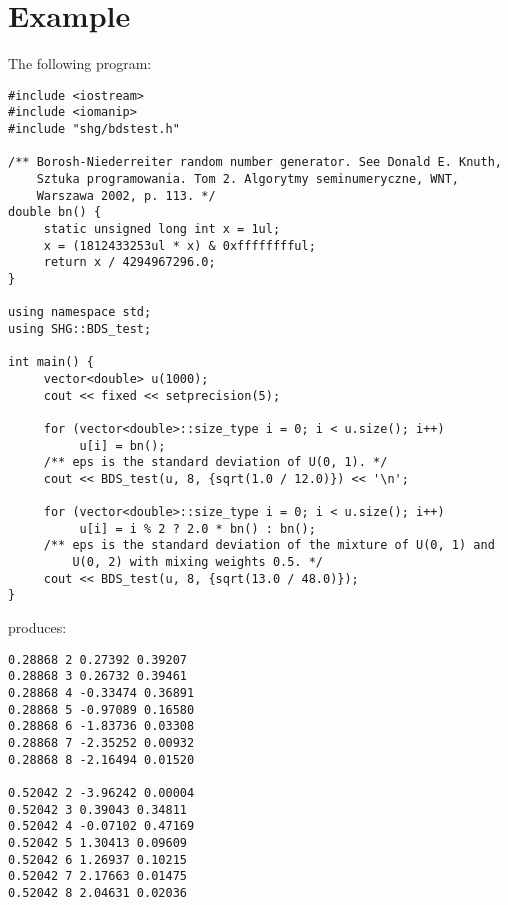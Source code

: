 \documentclass[a4paper,11pt]{article}
\begin{document}
\section{Example}

The following program:

{\footnotesize \begin{verbatim}
#include <iostream>
#include <iomanip>
#include "shg/bdstest.h"

/** Borosh-Niederreiter random number generator. See Donald E. Knuth,
    Sztuka programowania. Tom 2. Algorytmy seminumeryczne, WNT,
    Warszawa 2002, p. 113. */
double bn() {
     static unsigned long int x = 1ul;
     x = (1812433253ul * x) & 0xfffffffful;
     return x / 4294967296.0;
}

using namespace std;
using SHG::BDS_test;

int main() {
     vector<double> u(1000);
     cout << fixed << setprecision(5);

     for (vector<double>::size_type i = 0; i < u.size(); i++)
          u[i] = bn();
     /** eps is the standard deviation of U(0, 1). */
     cout << BDS_test(u, 8, {sqrt(1.0 / 12.0)}) << '\n';

     for (vector<double>::size_type i = 0; i < u.size(); i++)
          u[i] = i % 2 ? 2.0 * bn() : bn();
     /** eps is the standard deviation of the mixture of U(0, 1) and
         U(0, 2) with mixing weights 0.5. */
     cout << BDS_test(u, 8, {sqrt(13.0 / 48.0)});
}
\end{verbatim}}
\noindent produces:
{\footnotesize \begin{verbatim}
0.28868 2 0.27392 0.39207
0.28868 3 0.26732 0.39461
0.28868 4 -0.33474 0.36891
0.28868 5 -0.97089 0.16580
0.28868 6 -1.83736 0.03308
0.28868 7 -2.35252 0.00932
0.28868 8 -2.16494 0.01520

0.52042 2 -3.96242 0.00004
0.52042 3 0.39043 0.34811
0.52042 4 -0.07102 0.47169
0.52042 5 1.30413 0.09609
0.52042 6 1.26937 0.10215
0.52042 7 2.17663 0.01475
0.52042 8 2.04631 0.02036
\end{verbatim}}



\end{document}
